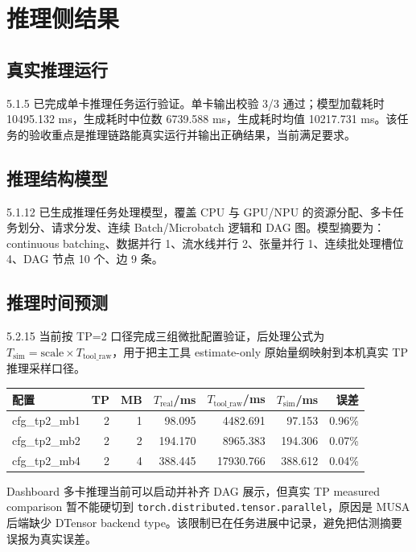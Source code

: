 \documentclass[UTF8,a4paper,11pt]{ctexart}
\begin{document}
\section{推理侧结果}

\subsection{真实推理运行}

5.1.5 已完成单卡推理任务运行验证。单卡输出校验 3/3 通过；模型加载耗时 10495.132 ms，生成耗时中位数 6739.588 ms，生成耗时均值 10217.731 ms。该任务的验收重点是推理链路能真实运行并输出正确结果，当前满足要求。

\subsection{推理结构模型}

5.1.12 已生成推理任务处理模型，覆盖 CPU 与 GPU/NPU 的资源分配、多卡任务划分、请求分发、连续 Batch/Microbatch 逻辑和 DAG 图。模型摘要为：continuous batching、数据并行 1、流水线并行 2、张量并行 1、连续批处理槽位 4、DAG 节点 10 个、边 9 条。

\subsection{推理时间预测}

5.2.15 当前按 TP=2 口径完成三组微批配置验证，后处理公式为 $T_{\mathrm{sim}}=\mathrm{scale}\times T_{\mathrm{tool\_raw}}$，用于把主工具 estimate-only 原始量纲映射到本机真实 TP 推理采样口径。

\begin{center}
\begin{tabular}{lrrrrrr}
\toprule
\textbf{配置} & \textbf{TP} & \textbf{MB} & \textbf{$T_{\mathrm{real}}$/ms} & \textbf{$T_{\mathrm{tool\_raw}}$/ms} & \textbf{$T_{\mathrm{sim}}$/ms} & \textbf{误差} \\
\midrule
cfg\_tp2\_mb1 & 2 & 1 & 98.095 & 4482.691 & 97.153 & 0.96\% \\
cfg\_tp2\_mb2 & 2 & 2 & 194.170 & 8965.383 & 194.306 & 0.07\% \\
cfg\_tp2\_mb4 & 2 & 4 & 388.445 & 17930.766 & 388.612 & 0.04\% \\
\bottomrule
\end{tabular}
\end{center}

Dashboard 多卡推理当前可以启动并补齐 DAG 展示，但真实 TP measured comparison 暂不能硬切到 \texttt{torch.distributed.tensor.parallel}，原因是 MUSA 后端缺少 DTensor backend type。该限制已在任务进展中记录，避免把估测摘要误报为真实误差。
\end{document}
